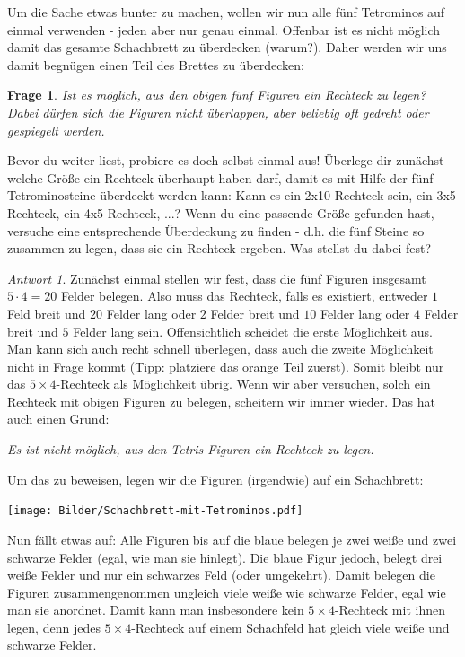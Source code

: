\documentclass[a4paper,ngerman,12pt]{scrartcl}
\theoremstyle{definition}
\theoremstyle{plain}
\newtheorem{frage}[defn]{Frage}
\theoremstyle{remark}
\newtheorem*{antwort}{Antwort}
\begin{document}
Um die Sache etwas bunter zu machen, wollen wir nun alle fünf Tetrominos auf einmal verwenden - jeden aber nur genau einmal. Offenbar ist es nicht möglich damit das gesamte Schachbrett zu überdecken (warum?). Daher werden wir uns damit begnügen einen Teil des Brettes zu überdecken:

\begin{frage}
	Ist es möglich, aus den obigen fünf Figuren ein Rechteck zu legen? Dabei dürfen sich die Figuren nicht überlappen, aber beliebig oft gedreht oder gespiegelt werden.
\end{frage}

Bevor du weiter liest, probiere es doch selbst einmal aus! Überlege dir zunächst welche Größe ein Rechteck überhaupt haben darf, damit es mit Hilfe der fünf Tetrominosteine überdeckt werden kann: Kann es ein 2x10-Rechteck sein, ein 3x5 Rechteck, ein 4x5-Rechteck, ...? Wenn du eine passende Größe gefunden hast, versuche eine entsprechende Überdeckung zu finden - d.h. die fünf Steine so zusammen zu legen, dass sie ein Rechteck ergeben. Was stellst du dabei fest?

\begin{antwort}
	Zunächst einmal stellen wir fest, dass die fünf Figuren insgesamt $5\cdot 4 = 20$ Felder belegen. Also muss das Rechteck, falls es existiert, entweder $1$ Feld breit und $20$ Felder lang oder $2$ Felder breit und $10$ Felder lang oder $4$ Felder breit und $5$ Felder lang sein. Offensichtlich scheidet die erste Möglichkeit aus. Man kann sich auch recht schnell überlegen, dass auch die zweite Möglichkeit nicht in Frage kommt (Tipp: platziere das orange Teil zuerst). Somit bleibt nur das $5\times 4$-Rechteck als Möglichkeit übrig. Wenn wir aber versuchen, solch ein Rechteck mit obigen Figuren zu belegen, scheitern wir immer wieder. Das hat auch einen Grund:
	
	\begin{center}
		\emph{Es ist nicht möglich, aus den Tetris-Figuren ein Rechteck zu legen.}
	\end{center}
	
	Um das zu beweisen, legen wir die Figuren (irgendwie) auf ein Schachbrett:
	
	\begin{center}
		\texttt{[image: Bilder/Schachbrett-mit-Tetrominos.pdf]}
	\end{center}	
	
	Nun fällt etwas auf: Alle Figuren bis auf die blaue belegen je zwei weiße und zwei schwarze Felder (egal, wie man sie hinlegt). Die blaue Figur jedoch, belegt drei weiße Felder und nur ein schwarzes Feld (oder umgekehrt). Damit belegen die Figuren zusammengenommen ungleich viele weiße wie schwarze Felder, egal wie man sie anordnet. Damit kann man insbesondere kein $5\times 4$-Rechteck mit ihnen legen, denn jedes $5\times 4$-Rechteck auf einem Schachfeld hat gleich viele weiße und schwarze Felder.
\end{antwort}
\end{document}
